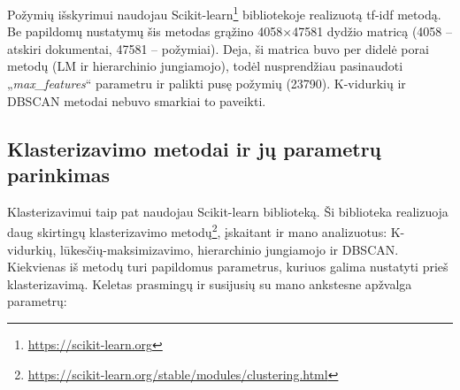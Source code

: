 \documentclass{VUMIFInfKursinis}
\begin{document}
Požymių išskyrimui naudojau Scikit-learn\footnote{\href{https://scikit-learn.org/stable/modules/clustering.html}{https://scikit-learn.org}}
bibliotekoje realizuotą tf-idf metodą. Be papildomų nustatymų šis
metodas grąžino 4058×47581 dydžio matricą (4058 – atskiri dokumentai,
47581 – požymiai). Deja, ši matrica buvo per didelė porai metodų (LM ir
hierarchinio jungiamojo), todėl nusprendžiau pasinaudoti
„\textit{max\_features}“ parametru ir palikti pusę požymių (23790).
K-vidurkių ir DBSCAN metodai nebuvo smarkiai to paveikti.






\subsection{Klasterizavimo metodai ir jų parametrų parinkimas}

Klasterizavimui taip pat naudojau Scikit-learn biblioteką. Ši biblioteka
realizuoja daug skirtingų klasterizavimo metodų\footnote{\url{https://scikit-learn.org/stable/modules/clustering.html}},
įskaitant ir mano analizuotus: K-vidurkių, lūkesčių-maksimizavimo,
hierarchinio jungiamojo ir DBSCAN. Kiekvienas iš metodų turi papildomus
parametrus, kuriuos galima nustatyti prieš klasterizavimą. Keletas
prasmingų ir susijusių su mano ankstesne apžvalga parametrų:
\end{document}
